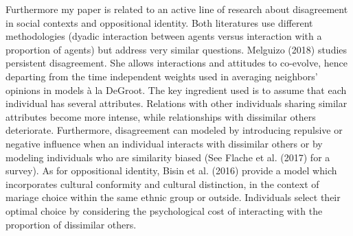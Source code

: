\documentclass{article}
\begin{document}
Furthermore my paper is related to an active line of research about disagreement in social contexts and oppositional identity. Both literatures use different methodologies (dyadic interaction between agents versus interaction with a proportion of agents) but address very similar questions. 
Melguizo (2018)\cite{melguizo} studies persistent disagreement. She allows interactions and attitudes to co-evolve, hence departing from the time independent weights used in averaging neighbors' opinions in models \`{a} la DeGroot. The key ingredient used is to assume that each individual has several attributes. Relations with other individuals sharing similar attributes become more intense, while relationships with dissimilar others deteriorate. Furthermore, disagreement can modeled by introducing repulsive or negative influence when an individual interacts with dissimilar others or by modeling individuals who are similarity biased (See Flache et al. (2017)\cite{flachesurvey2017} for a survey). As for oppositional identity, Bisin et al. (2016)\cite{bisinzenou} provide a model which incorporates cultural conformity and cultural distinction, in the context of mariage choice within the same ethnic group or outside. Individuals select their optimal choice by considering the psychological cost of interacting with the proportion of dissimilar others. 


\end{document}
